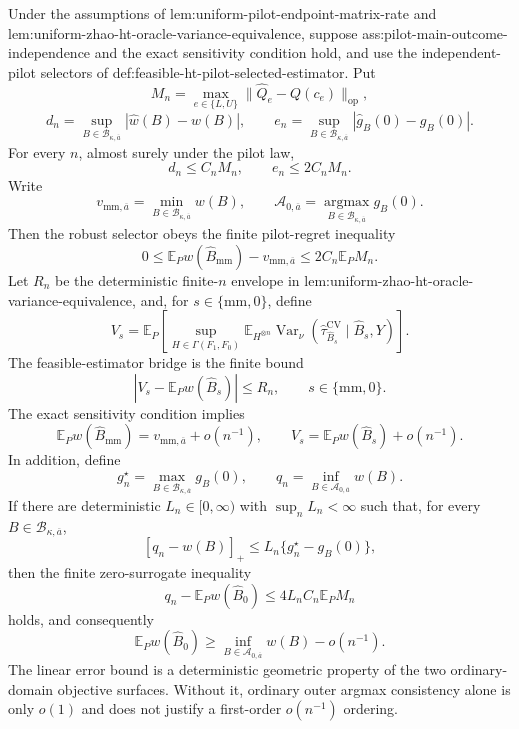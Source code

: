 Under the assumptions of lem:uniform-pilot-endpoint-matrix-rate and lem:uniform-zhao-ht-oracle-variance-equivalence, suppose ass:pilot-main-outcome-independence and the exact sensitivity condition hold, and use the independent-pilot selectors of def:feasible-ht-pilot-selected-estimator.  Put
\[
M_n=\max_{e\in\{L,U\}}\lVert\widehat Q_e-Q(c_e)\rVert_{\mathrm{op}},
\]
\[
d_n=\sup_{B\in\mathcal B_{\kappa,\overline a}}|\widehat w(B)-w(B)|,
\qquad
e_n=\sup_{B\in\mathcal B_{\kappa,\overline a}}|\widehat g_B(0)-g_B(0)|.
\]
For every \(n\), almost surely under the pilot law,
\[
d_n\le C_nM_n,
\qquad
e_n\le2C_nM_n.
\]
Write
\[
v_{\mathrm{mm},\overline a}=\min_{B\in\mathcal B_{\kappa,\overline a}}w(B),
\qquad
\mathcal A_{0,\overline a}=\operatorname*{argmax}_{B\in\mathcal B_{\kappa,\overline a}}g_B(0).
\]
Then the robust selector obeys the finite pilot-regret inequality
\[
0\le
\mathbb E_Pw(\widehat B_{\mathrm{mm}})-v_{\mathrm{mm},\overline a}
\le2C_n\mathbb E_PM_n.
\]
Let \(R_n\) be the deterministic finite-\(n\) envelope in lem:uniform-zhao-ht-oracle-variance-equivalence, and, for \(s\in\{\mathrm{mm},0\}\), define
\[
V_s=
\mathbb E_P\left[
\sup_{H\in\Gamma(F_1,F_0)}
\mathbb E_{H^{\otimes n}}
\operatorname{Var}_\nu
(\widehat\tau_{\widehat B_s}^{\mathrm{CV}}\mid\widehat B_s,Y)
\right].
\]
The feasible-estimator bridge is the finite bound
\[
|V_s-\mathbb E_Pw(\widehat B_s)|\le R_n,
\qquad s\in\{\mathrm{mm},0\}.
\]
The exact sensitivity condition implies
\[
\mathbb E_Pw(\widehat B_{\mathrm{mm}})
=v_{\mathrm{mm},\overline a}+o(n^{-1}),
\qquad
V_s=\mathbb E_Pw(\widehat B_s)+o(n^{-1}).
\]
In addition, define
\[
g_n^\star=\max_{B\in\mathcal B_{\kappa,\overline a}}g_B(0),
\qquad
q_n=\inf_{B\in\mathcal A_{0,\overline a}}w(B).
\]
If there are deterministic \(L_n\in[0,\infty)\) with \(\sup_nL_n<\infty\) such that, for every \(B\in\mathcal B_{\kappa,\overline a}\),
\[
[q_n-w(B)]_+\le L_n\{g_n^\star-g_B(0)\},
\]
then the finite zero-surrogate inequality
\[
q_n-\mathbb E_Pw(\widehat B_0)
\le4L_nC_n\mathbb E_PM_n
\]
holds, and consequently
\[
\mathbb E_Pw(\widehat B_0)
\ge\inf_{B\in\mathcal A_{0,\overline a}}w(B)-o(n^{-1}).
\]
The linear error bound is a deterministic geometric property of the two ordinary-domain objective surfaces.  Without it, ordinary outer argmax consistency alone is only \(o(1)\) and does not justify a first-order \(o(n^{-1})\) ordering.